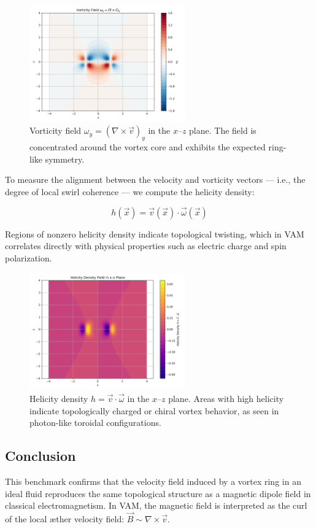 \begin{figure}[H]
    \centering
    \includegraphics[width=0.6\textwidth]{images/dipole_3}
    \caption{Vorticity field $\omega_y = (\nabla \times \vec{v})_y$ in the $x$–$z$ plane. The field is concentrated around the vortex core and exhibits the expected ring-like symmetry.}
\end{figure}

To measure the alignment between the velocity and vorticity vectors — i.e., the degree of local swirl coherence — we compute the helicity density:

\begin{equation}
h(\vec{x}) = \vec{v}(\vec{x}) \cdot \vec{\omega}(\vec{x})
\end{equation}

Regions of nonzero helicity density indicate topological twisting, which in VAM correlates directly with physical properties such as electric charge and spin polarization.

\begin{figure}[H]
    \centering
    \includegraphics[width=0.6\textwidth]{images/dipole_4}
    \caption{Helicity density $h = \vec{v} \cdot \vec{\omega}$ in the $x$–$z$ plane. Areas with high helicity indicate topologically charged or chiral vortex behavior, as seen in photon-like toroidal configurations.}
\end{figure}


\subsection{Conclusion}

This benchmark confirms that the velocity field induced by a vortex ring in an ideal fluid reproduces the same topological structure as a magnetic dipole field in classical electromagnetism. In VAM, the magnetic field is interpreted as the curl of the local æther velocity field: $\vec{B} \sim \nabla \times \vec{v}$.


